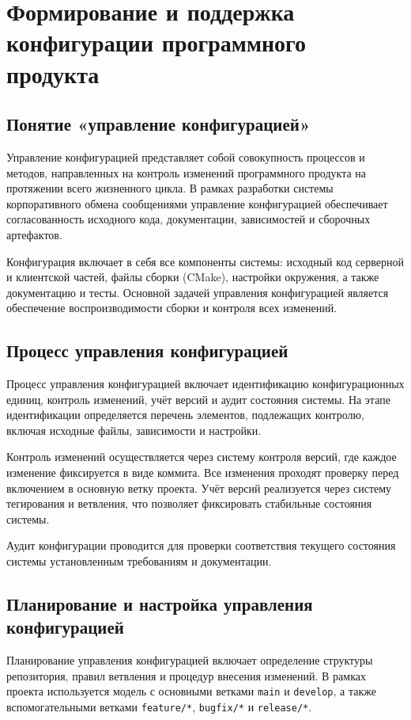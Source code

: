 \documentclass[14pt,a4paper]{extarticle}
\begin{document}
\section{Формирование и поддержка конфигурации программного продукта}

\subsection{Понятие «управление конфигурацией»}

Управление конфигурацией представляет собой совокупность процессов и методов, направленных на контроль изменений программного продукта на протяжении всего жизненного цикла. В рамках разработки системы корпоративного обмена сообщениями управление конфигурацией обеспечивает согласованность исходного кода, документации, зависимостей и сборочных артефактов.

Конфигурация включает в себя все компоненты системы: исходный код серверной и клиентской частей, файлы сборки (CMake), настройки окружения, а также документацию и тесты. Основной задачей управления конфигурацией является обеспечение воспроизводимости сборки и контроля всех изменений.

\subsection{Процесс управления конфигурацией}

Процесс управления конфигурацией включает идентификацию конфигурационных единиц, контроль изменений, учёт версий и аудит состояния системы. На этапе идентификации определяется перечень элементов, подлежащих контролю, включая исходные файлы, зависимости и настройки.

Контроль изменений осуществляется через систему контроля версий, где каждое изменение фиксируется в виде коммита. Все изменения проходят проверку перед включением в основную ветку проекта. Учёт версий реализуется через систему тегирования и ветвления, что позволяет фиксировать стабильные состояния системы.

Аудит конфигурации проводится для проверки соответствия текущего состояния системы установленным требованиям и документации.

\subsection{Планирование и настройка управления конфигурацией}

Планирование управления конфигурацией включает определение структуры репозитория, правил ветвления и процедур внесения изменений. В рамках проекта используется модель с основными ветками \texttt{main} и \texttt{develop}, а также вспомогательными ветками \texttt{feature/*}, \texttt{bugfix/*} и \texttt{release/*}.
\end{document}
